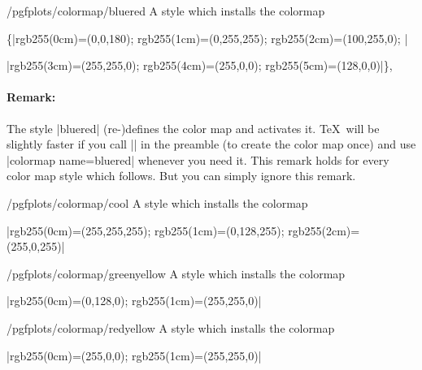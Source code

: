 \begin{stylekey}{/pgfplots/colormap/bluered}
	A style which installs the colormap

	\{|rgb255(0cm)=(0,0,180); rgb255(1cm)=(0,255,255); rgb255(2cm)=(100,255,0); |

	|rgb255(3cm)=(255,255,0); rgb255(4cm)=(255,0,0); rgb255(5cm)=(128,0,0)|\},


\begin{codeexample}[]
\end{codeexample}

	\paragraph{Remark:} 
	The style |bluered| (re-)defines the color map and activates it. \TeX\ will be slightly faster if you call |\pgfplotsset{colormap/bluered}| in the preamble (to create the color map once) and use |colormap name=bluered| whenever you need it. This remark holds for every color map style which follows. But you can simply ignore this remark.
\end{stylekey}

\begin{stylekey}{/pgfplots/colormap/cool}
	A style which installs the colormap

	|{rgb255(0cm)=(255,255,255); rgb255(1cm)=(0,128,255); rgb255(2cm)=(255,0,255)}|

\end{stylekey}

\begin{stylekey}{/pgfplots/colormap/greenyellow}
	A style which installs the colormap

	|{rgb255(0cm)=(0,128,0); rgb255(1cm)=(255,255,0)}|

\end{stylekey}

\begin{stylekey}{/pgfplots/colormap/redyellow}
	A style which installs the colormap

	|{rgb255(0cm)=(255,0,0); rgb255(1cm)=(255,255,0)}|

\end{stylekey}

